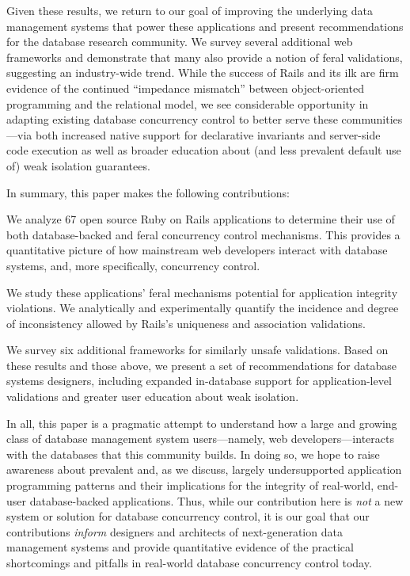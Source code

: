 Given these results, we return to our goal of improving the underlying
data management systems that power these applications and present
recommendations for the database research community. We survey several
additional web frameworks and demonstrate that many also provide a
notion of feral validations, suggesting an industry-wide trend. While
the success of Rails and its ilk are firm evidence of the continued
``impedance mismatch'' between object-oriented programming and the
relational model, we see considerable opportunity in adapting existing
database concurrency control to better serve these communities---via
both increased native support for declarative invariants and
server-side code execution as well as broader education about (and
less prevalent default use of) weak isolation guarantees.

In summary, this paper makes the following contributions:
\begin{myitemize}
\item We analyze 67 open source Ruby on Rails applications to
  determine their use of both database-backed and feral concurrency
  control mechanisms. This provides a quantitative picture of how
  mainstream web developers interact with database systems, and, more
  specifically, concurrency control.

\item We study these applications' feral mechanisms potential for
  application integrity violations. We analytically and experimentally
  quantify the incidence and degree of inconsistency allowed by
  Rails's uniqueness and association validations.

\item We survey six additional frameworks for similarly unsafe
  validations. Based on these results and those above, we present a
  set of recommendations for database systems designers, including
  expanded in-database support for application-level validations and
  greater user education about weak isolation.
\end{myitemize}

In all, this paper is a pragmatic attempt to understand how a large
and growing class of database management system users---namely, web
developers---interacts with the databases that this community
builds. In doing so, we hope to raise awareness about prevalent and,
as we discuss, largely undersupported application programming
patterns and their implications for the integrity of real-world, end-user
database-backed applications. Thus, while our contribution here is
\textit{not} a new system or solution for database concurrency
control, it is our goal that our contributions \textit{inform}
designers and architects of next-generation data management systems
and provide quantitative evidence of the practical shortcomings and
pitfalls in real-world database concurrency control today.

